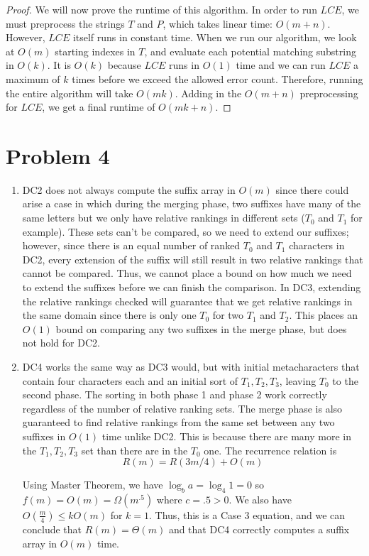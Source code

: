 \documentclass{article}
\theoremstyle{casestyle}
\begin{document}
\begin{proof}
We will now prove the runtime of this algorithm. In order to run $LCE$, we must preprocess the strings $T$ and $P$, which takes linear time: $O(m + n)$. However, $LCE$ itself runs in constant time. When we run our algorithm, we look at $O(m)$ starting indexes in $T$, and evaluate each potential matching substring in $O(k)$. It is $O(k)$ because $LCE$ runs in $O(1)$ time and we can run $LCE$ a maximum of $k$ times before we exceed the allowed error count. Therefore, running the entire algorithm will take $O(mk)$. Adding in the $O(m + n)$ preprocessing for $LCE$, we get a final runtime of $O(mk + n)$.
\end{proof}

\section *{Problem 4}
\begin{enumerate}[i]
\item DC2 does not always compute the suffix array in $O(m)$ since there could arise a case in which during the merging phase, two suffixes have many of the same letters but we only have relative rankings in different sets ($T_0$ and $T_1$ for example). These sets can't be compared, so we need to extend our suffixes; however, since there is an equal number of ranked $T_0$ and $T_1$ characters in DC2, every extension of the suffix will still result in two relative rankings that cannot be compared. Thus, we cannot place a bound on how much we need to extend the suffixes before we can finish the comparison. In DC3, extending the relative rankings checked will guarantee that we get relative rankings in the same domain since there is only one $T_0$ for two $T_1$ and $T_2$. This places an $O(1)$ bound on comparing any two suffixes in the merge phase, but does not hold for DC2.
\item DC4 works the same way as DC3 would, but with initial metacharacters that contain four characters each and an initial sort of $T_1, T_2, T_3$, leaving $T_0$ to the second phase. The sorting in both phase 1 and phase 2 work correctly regardless of the number of relative ranking sets. The merge phase is also guaranteed to find relative rankings from the same set between any two suffixes in $O(1)$ time unlike DC2. This is because there are many more in the $T_1, T_2, T_3$ set than there are in the $T_0$ one. The recurrence relation is \[
    R(m) = R(3m/4) + O(m)
\]

Using Master Theorem, we have $\log_b a = \log_4 1 = 0$ so $f(m) = O(m) = \Omega(m^{.5})$ where $c=.5 > 0$. We also have $O(\frac{m}{4}) \leq kO(m)$ for $k=1$. Thus, this is a Case 3 equation, and we can conclude that $R(m) = \Theta(m)$ and that DC4 correctly computes a suffix array in $O(m)$  time.
 
\end{enumerate}
\end{document}
